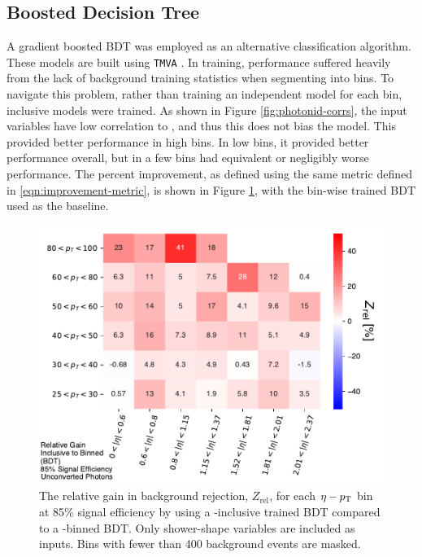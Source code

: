 \subsection{Boosted Decision Tree}\label{ssec:yid-bdt}

A gradient boosted \gls{BDT} was employed as an alternative classification algorithm. These models are built using \texttt{TMVA} \cite{TMVA}. In training, performance suffered heavily from the lack of background training statistics when segmenting into \etaPt bins. To navigate this problem, rather than training an independent model for each \etaPt bin, \pt inclusive models were trained. As shown in Figure \ref{fig:photonid-corrs}, the input variables have low correlation to \pt, and thus this does not bias the model. This provided better performance in high \pt bins. In low \pt bins, it provided better performance overall, but in a few bins had equivalent or negligibly worse performance. The percent improvement, as defined using the same metric defined in \ref{eqn:improvement-metric}, is shown in Figure \ref{fig:bdtinclusive-vs-bdt}, with the bin-wise trained \gls{BDT} used as the baseline.

\begin{figure}[!htb]
    \centering
    \includegraphics[width=.85\textwidth]{chapters/chapter4_photonID/images/BDTInclusive_v_BDT_normed.pdf}
    \caption[The relative gain in background rejection by using a \pt-inclusive trained \gls{BDT} compared to a \pt-binned \gls{BDT}]
    {The relative gain in background rejection, $Z_{\text{rel}}$, for each $\eta-p_{\text{T}}$ bin at 85\% signal efficiency by using a \pt-inclusive trained \gls{BDT} compared to a \pt-binned \gls{BDT}. Only shower-shape variables are included as inputs. Bins with fewer than 400 background events are masked.}
    \label{fig:bdtinclusive-vs-bdt}
\end{figure}


